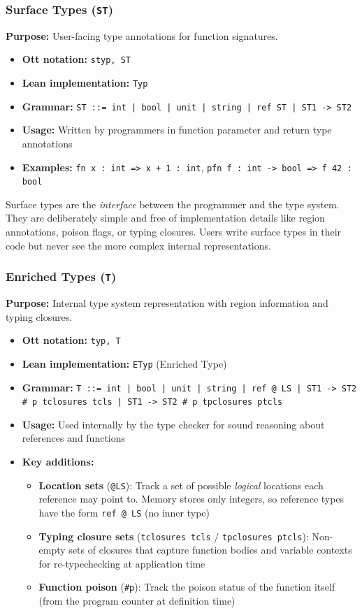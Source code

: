\documentclass[12pt]{article}
\begin{document}
\subsubsection{Surface Types (\texttt{ST})}
\textbf{Purpose:} User-facing type annotations for function signatures.
\begin{itemize}
    \item \textbf{Ott notation:} \texttt{styp, ST}
    \item \textbf{Lean implementation:} \texttt{Typ}
    \item \textbf{Grammar:} \texttt{ST ::= int | bool | unit | string | ref ST | ST1 -> ST2}
    \item \textbf{Usage:} Written by programmers in function parameter and return type annotations
    \item \textbf{Examples:} \texttt{fn x : int => x + 1 : int}, \texttt{pfn f : int -> bool => f 42 : bool}
\end{itemize}

Surface types are the \emph{interface} between the programmer and the type
system. They are deliberately simple and free of implementation details like
region annotations, poison flags, or typing closures. Users write surface types
in their code but never see the more complex internal representations.

\subsubsection{Enriched Types (\texttt{T})}
\textbf{Purpose:} Internal type system representation with region information and typing closures.
\begin{itemize}
    \item \textbf{Ott notation:} \texttt{typ, T}
    \item \textbf{Lean implementation:} \texttt{ETyp} (Enriched Type)
    \item \textbf{Grammar:} \texttt{T ::= int | bool | unit | string | ref @ LS | ST1 -> ST2 \# p tclosures tcls | ST1 -> ST2 \# p tpclosures ptcls}
    \item \textbf{Usage:} Used internally by the type checker for sound reasoning about references and functions
    \item \textbf{Key additions:}
    \begin{itemize}
        \item \textbf{Location sets} (\texttt{@LS}): Track a set of possible \emph{logical} locations each reference may point to. Memory stores only integers, so reference types have the form \texttt{ref @ LS} (no inner type)
        \item \textbf{Typing closure sets} (\texttt{tclosures tcls} / \texttt{tpclosures ptcls}): Non-empty sets of closures that capture function bodies and variable contexts for re-typechecking at application time
        \item \textbf{Function poison} (\texttt{\#p}): Track the poison status of the function itself (from the program counter at definition time)
    \end{itemize}
\end{itemize}
\end{document}
